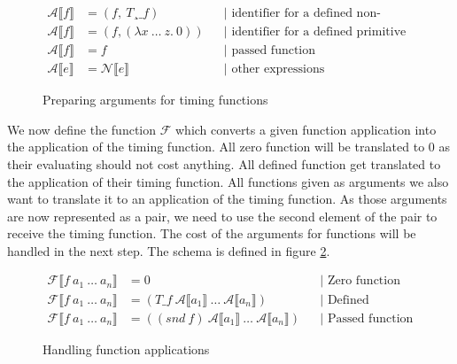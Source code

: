 \begin{figure}
  \begin{align*}
    \mathcal{A}\llbracket f\rrbracket &= (f,\ T¸\_f) &&\text{| identifier for a defined non-primitive function}\\
    \mathcal{A}\llbracket f\rrbracket &= (f, (\lambda x\ \dots\ z.\ 0)) &&\text{| identifier for a defined primitive function}\\
    \mathcal{A}\llbracket f\rrbracket &= f &&\text{| passed function}\\
    \mathcal{A}\llbracket e\rrbracket &= \mathcal{N}\llbracket e\rrbracket &&\text{| other expressions}
  \end{align*}
  \caption{Preparing arguments for timing functions}
  \label{fig:schema_A}
\end{figure}

We now define the function $\mathcal{F}$ which converts a given function application into the application of the timing function.
All zero function will be translated to $0$ as their evaluating should not cost anything.
All defined function get translated to the application of their timing function.
All functions given as arguments we also want to translate it to an application of the timing function.
As those arguments are now represented as a pair, we need to use the second element of the pair to receive the timing function.
The cost of the arguments for functions will be handled in the next step.
The schema is defined in figure \ref{fig:schema_F}.
\begin{figure}
\begin{align*}
  \mathcal{F}\llbracket f\ a_{1}\ \dots\ a_{n}\rrbracket &= 0 &&\text{| Zero function}\\
  \mathcal{F}\llbracket f\ a_{1}\ \dots\ a_{n}\rrbracket &= (T\_f\ \mathcal{A}\llbracket a_{1}\rrbracket\ \dots\ \mathcal{A}\llbracket a_{n}\rrbracket) &&\text{| Defined function}\\
  \mathcal{F}\llbracket f\ a_{1}\ \dots\ a_{n}\rrbracket &= ((snd\ f)\ \mathcal{A}\llbracket a_{1}\rrbracket\ \dots\ \mathcal{A}\llbracket a_{n}\rrbracket) &&\text{| Passed function}
\end{align*}
\caption{Handling function applications}
\label{fig:schema_F}
\end{figure}

